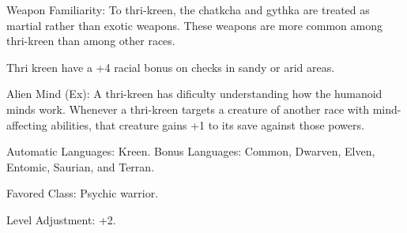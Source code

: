 \begin{itemize*}
    \item Weapon Familiarity: To thri-kreen, the chatkcha and gythka are treated as martial rather than exotic weapons. These weapons are more common among thri-kreen than among other races.
    \item Thri kreen have a +4 racial bonus on  checks in sandy or arid areas.
    \item Alien Mind (Ex): A thri-kreen has dificulty understanding how the humanoid minds work. Whenever a thri-kreen targets a creature of another race with mind-affecting abilities, that creature gains +1 to its save against those powers.
    \item Automatic Languages: Kreen. Bonus Languages: Common, Dwarven, Elven, Entomic, Saurian, and Terran.
    \item Favored Class: Psychic warrior.
    \item Level Adjustment: +2.
\end{itemize*}
